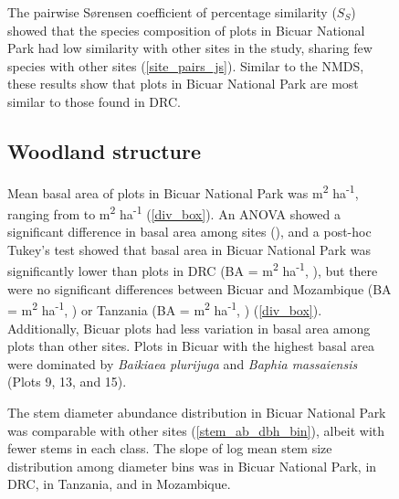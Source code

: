 \documentclass[diversity,article,submit,moreauthors,pdftex]{Definitions/mdpi}
\begin{document}
\begin{figure}[H]
The pairwise S\o{}rensen coefficient of percentage similarity ($S_{S}$) showed that the species composition of plots in Bicuar National Park had low similarity with other sites in the study, sharing few species with other sites (\autoref{site_pairs_js}). Similar to the NMDS, these results show that plots in Bicuar National Park are most similar to those found in DRC. 



\subsection{Woodland structure}

Mean basal area of plots in Bicuar National Park was \babicuar{} m\textsuperscript{2} ha\textsuperscript{-1}, ranging from \bicuarbamin{} to \bicuarbamax{} m\textsuperscript{2} ha\textsuperscript{-1} (\autoref{div_box}). An ANOVA showed a significant difference in basal area among sites (\lmba{}), and a post-hoc Tukey's test showed that basal area in Bicuar National Park was significantly lower than plots in DRC (BA = \badrc{} m\textsuperscript{2} ha\textsuperscript{-1}, \tukeybabicuardrc{}), but there were no significant differences between Bicuar and Mozambique (BA = \banham{} m\textsuperscript{2} ha\textsuperscript{-1}, \tukeybabicuarnham{}) or Tanzania (BA = \bakilwa{} m\textsuperscript{2} ha\textsuperscript{-1}, \tukeybabicuarkilwa{}) (\autoref{div_box}). Additionally, Bicuar plots had less variation in basal area among plots than other sites. Plots in Bicuar with the highest basal area were dominated by \textit{Baikiaea plurijuga} and \textit{Baphia massaiensis} (Plots 9, 13, and 15). 

The stem diameter abundance distribution in Bicuar National Park was comparable with other sites (\autoref{stem_ab_dbh_bin}), albeit with fewer stems in each class. The slope of log mean stem size distribution among diameter bins was \dbhslopebicuar{} in Bicuar National Park, \dbhslopedrc{} in DRC, \dbhslopekilwa{} in Tanzania, and \dbhslopenham{} in Mozambique.  


\end{figure}
\end{document}

